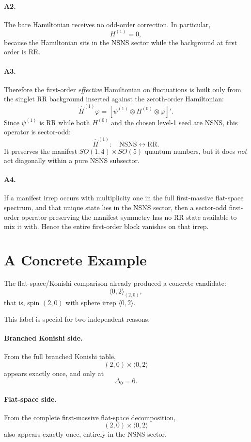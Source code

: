 \documentclass[12pt]{article}
\def\be{\begin{equation}}
\def\ee{\end{equation}}
\newcommand{\D}{\Delta}
\newcommand{\la}{\langle}
\newcommand{\ra}{\rangle}
\begin{document}
\paragraph{A2.} The bare Hamiltonian receives no odd-order correction.
In particular,
\be
H^{(1)}=0,
\ee
because the Hamiltonian sits in the NSNS sector while the background at first order is RR.

\paragraph{A3.} Therefore the first-order \emph{effective} Hamiltonian on fluctuations is built only
from the singlet RR background inserted against the zeroth-order Hamiltonian:
\be
\widehat H^{(1)}\varphi=[\psi^{(1)}\otimes H^{(0)}\otimes\varphi]'.
\ee
Since $\psi^{(1)}$ is RR while both $H^{(0)}$ and the chosen level-1 seed are NSNS,
this operator is sector-odd:
\be
\widehat H^{(1)}:\quad \text{NSNS}\leftrightarrow \text{RR}.
\ee
It preserves the manifest $SO(1,4)\times SO(5)$ quantum numbers, but it does \emph{not}
act diagonally within a pure NSNS subsector.

\paragraph{A4.} If a manifest irrep occurs with multiplicity one in the full first-massive flat-space
spectrum, and that unique state lies in the NSNS sector, then a sector-odd first-order operator preserving
the manifest symmetry has no RR state available to mix it with. Hence the entire first-order block vanishes
on that irrep.

\section{A Concrete Example}

The flat-space/Konishi comparison already produced a concrete candidate:
\be
\la 0,2\ra_{(2,0)},
\ee
that is, spin $(2,0)$ with sphere irrep $\la 0,2\ra$.

This label is special for two independent reasons.

\paragraph{Branched Konishi side.}
From the full branched Konishi table,
\be
(2,0)\times \la 0,2\ra
\ee
appears exactly once, and only at
\be
\D_0=6.
\ee

\paragraph{Flat-space side.}
From the complete first-massive flat-space decomposition,
\be
(2,0)\times \la 0,2\ra
\ee
also appears exactly once, entirely in the NSNS sector.
\end{document}
